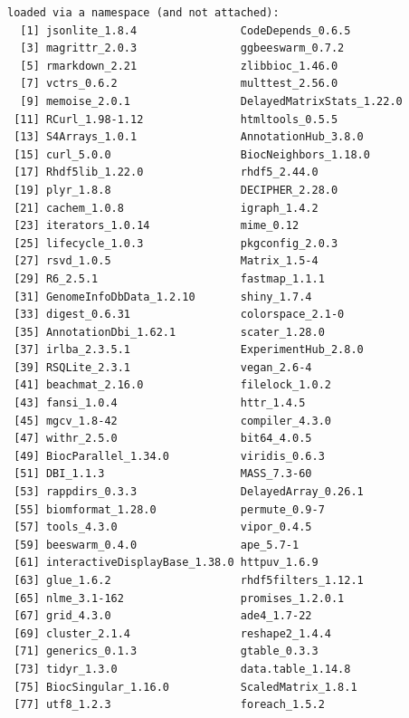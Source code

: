 \documentclass[
]{book}
\begin{document}
\begin{verbatim}
loaded via a namespace (and not attached):
  [1] jsonlite_1.8.4                CodeDepends_0.6.5            
  [3] magrittr_2.0.3                ggbeeswarm_0.7.2             
  [5] rmarkdown_2.21                zlibbioc_1.46.0              
  [7] vctrs_0.6.2                   multtest_2.56.0              
  [9] memoise_2.0.1                 DelayedMatrixStats_1.22.0    
 [11] RCurl_1.98-1.12               htmltools_0.5.5              
 [13] S4Arrays_1.0.1                AnnotationHub_3.8.0          
 [15] curl_5.0.0                    BiocNeighbors_1.18.0         
 [17] Rhdf5lib_1.22.0               rhdf5_2.44.0                 
 [19] plyr_1.8.8                    DECIPHER_2.28.0              
 [21] cachem_1.0.8                  igraph_1.4.2                 
 [23] iterators_1.0.14              mime_0.12                    
 [25] lifecycle_1.0.3               pkgconfig_2.0.3              
 [27] rsvd_1.0.5                    Matrix_1.5-4                 
 [29] R6_2.5.1                      fastmap_1.1.1                
 [31] GenomeInfoDbData_1.2.10       shiny_1.7.4                  
 [33] digest_0.6.31                 colorspace_2.1-0             
 [35] AnnotationDbi_1.62.1          scater_1.28.0                
 [37] irlba_2.3.5.1                 ExperimentHub_2.8.0          
 [39] RSQLite_2.3.1                 vegan_2.6-4                  
 [41] beachmat_2.16.0               filelock_1.0.2               
 [43] fansi_1.0.4                   httr_1.4.5                   
 [45] mgcv_1.8-42                   compiler_4.3.0               
 [47] withr_2.5.0                   bit64_4.0.5                  
 [49] BiocParallel_1.34.0           viridis_0.6.3                
 [51] DBI_1.1.3                     MASS_7.3-60                  
 [53] rappdirs_0.3.3                DelayedArray_0.26.1          
 [55] biomformat_1.28.0             permute_0.9-7                
 [57] tools_4.3.0                   vipor_0.4.5                  
 [59] beeswarm_0.4.0                ape_5.7-1                    
 [61] interactiveDisplayBase_1.38.0 httpuv_1.6.9                 
 [63] glue_1.6.2                    rhdf5filters_1.12.1          
 [65] nlme_3.1-162                  promises_1.2.0.1             
 [67] grid_4.3.0                    ade4_1.7-22                  
 [69] cluster_2.1.4                 reshape2_1.4.4               
 [71] generics_0.1.3                gtable_0.3.3                 
 [73] tidyr_1.3.0                   data.table_1.14.8            
 [75] BiocSingular_1.16.0           ScaledMatrix_1.8.1           
 [77] utf8_1.2.3                    foreach_1.5.2                

\end{verbatim}
\end{document}
